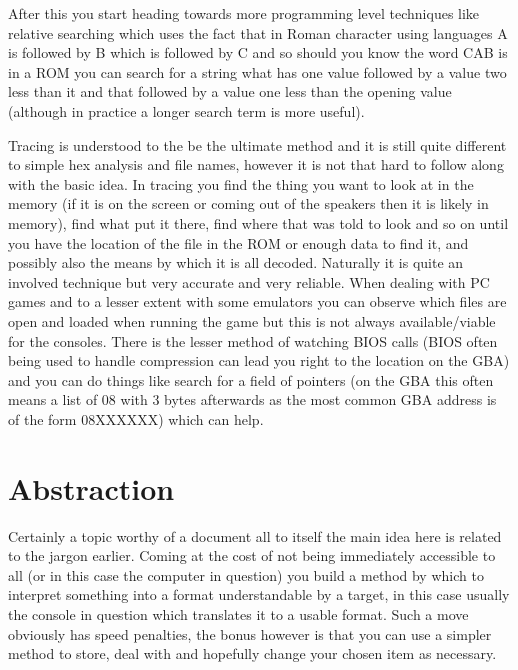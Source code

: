 \documentclass[
]{book}
\begin{document}
After this you start heading towards more programming level techniques like relative searching which uses the fact that in Roman character using languages A is followed by B which is followed by C and so should you know the word CAB is in a ROM you can search for a string what has one value followed by a value two less than it and that followed by a value one less than the opening value (although in practice a longer search term is more useful).

Tracing is understood to the be the ultimate method and it is still quite different to simple hex analysis and file names, however it is not that hard to follow along with the basic idea. In tracing you find the thing you want to look at in the memory (if it is on the screen or coming out of the speakers then it is likely in memory), find what put it there, find where that was told to look and so on until you have the location of the file in the ROM or enough data to find it, and possibly also the means by which it is all decoded. Naturally it is quite an involved technique but very accurate and very reliable. When dealing with PC games and to a lesser extent with some emulators you can observe which files are open and loaded when running the game but this is not always available/viable for the consoles. There is the lesser method of watching BIOS calls (BIOS often being used to handle compression can lead you right to the location on the GBA) and you can do things like search for a field of pointers (on the GBA this often means a list of 08 with 3 bytes afterwards as the most common GBA address is of the form 08XXXXXX) which can help.

\hypertarget{abstraction}{%
\section{Abstraction}\label{abstraction}}

Certainly a topic worthy of a document all to itself the main idea here is related to the jargon earlier. Coming at the cost of not being immediately accessible to all (or in this case the computer in question) you build a method by which to interpret something into a format understandable by a target, in this case usually the console in question which translates it to a usable format. Such a move obviously has speed penalties, the bonus however is that you can use a simpler method to store, deal with and hopefully change your chosen item as necessary.
\end{document}
